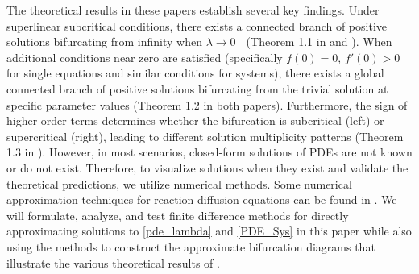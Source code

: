\documentclass[12pt, reqno]{amsart}
\numberwithin{equation}{section}
\begin{document}
The theoretical results in these papers establish several key findings. Under superlinear subcritical conditions, there exists a connected branch of positive solutions bifurcating from infinity when $\lambda \to 0^+$ (Theorem 1.1 in \cite{BCDMP_2024} and \cite{BCDMP_Systems}). When additional conditions near zero are satisfied (specifically $f(0) = 0$, $f'(0) > 0$ for single equations and similar conditions for systems), there exists a global connected branch of positive solutions bifurcating from the trivial solution at specific parameter values (Theorem 1.2 in both papers). Furthermore, the sign of higher-order terms determines whether the bifurcation is subcritical (left) or supercritical (right), leading to different solution multiplicity patterns (Theorem 1.3 in \cite{BCDMP_Systems}). However, in most scenarios, closed-form solutions of PDEs are not known or do not exist. Therefore, to visualize solutions when they exist and validate the theoretical predictions, we utilize numerical methods. Some numerical approximation techniques for reaction-diffusion equations can be found in \cite{Pao1, Pao2, Pao3, Neu-Swift, Neu-Swift-Sie}.  
We will formulate, analyze, and test finite difference methods for directly approximating solutions to \eqref{pde_lambda} and \eqref{PDE_Sys} in this paper while also using the methods to construct the approximate bifurcation diagrams that illustrate the various theoretical results of \cite{BCDMP_2024,BCDMP_Systems}. 
\end{document}
